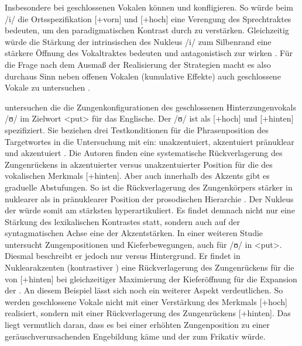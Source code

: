 Insbesondere bei geschlossenen Vokalen können  und  konfligieren. So würde beim  /i/ die Ortsspezifikation [+vorn] und [+hoch] eine Verengung des Sprechtraktes bedeuten, um den paradigmatischen Kontrast durch  zu verstärken. Gleichzeitig würde die Stärkung der intrinsischen  des Nukleus /i/ zum Silbenrand eine stärkere Öffnung des Vokaltraktes bedeuten und antagonistisch zur  wirken \citep{Harrington2000}. Für die Frage nach dem Ausmaß der Realisierung der Strategien macht es also durchaus Sinn neben offenen Vokalen (kumulative Effekte) auch geschlossene Vokale zu untersuchen \citep[Konflikt der Strategien,][]{Cho2005a}.

\citet[][210]{DeJong1993} untersuchen die die Zungenkonfigurationen des geschlossenen Hinterzungenvokals /ʊ/ im Zielwort <put> für das Englische. Der  /ʊ/ ist als [+hoch] und [+hinten] spezifiziert. Sie beziehen drei Testkonditionen für die Phrasenposition des Targetwortes in die Untersuchung mit ein: unakzentuiert, akzentuiert pränuklear und akzentuiert . Die Autoren finden eine systematische Rückverlagerung des Zungenrückens in akzentuierter versus unakzentuierter Position für die  des vokalischen Merkmals [+hinten]. Aber auch innerhalb des Akzents gibt es graduelle Abstufungen. So ist die Rückverlagerung des Zungenkörpers stärker in nuklearer als in pränuklearer Position der prosodischen Hierarchie \citep{Shattuck1996}. Der Nukleus der  würde somit am stärksten hyperartikuliert. Es findet demnach nicht nur eine Stärkung des lexikalischen Kontrastes statt, sondern auch auf der syntagmatischen Achse eine  der Akzentstärken. In einer weiteren Studie untersucht \citet{DeJong1995} Zungenpositionen und Kieferbewegungen, auch für /ʊ/ in <put>. Diesmal beschreibt er jedoch nur  versus Hintergrund. Er findet in Nuklearakzenten (kontrastiver ) eine Rückverlagerung des Zungenrückens für die  von [+hinten] bei gleichzeitiger Maximierung der Kieferöffnung für die Expansion der . An diesem Beispiel lässt sich noch ein weiterer Aspekt verdeutlichen. So werden geschlossene Vokale nicht mit einer Verstärkung des Merkmals [+hoch] realisiert, sondern mit einer Rückverlagerung des Zungenrückens [+hinten]. Das liegt vermutlich daran, dass es bei einer erhöhten Zungenposition zu einer geräuschverursachenden Engebildung käme und der  zum Frikativ würde.

